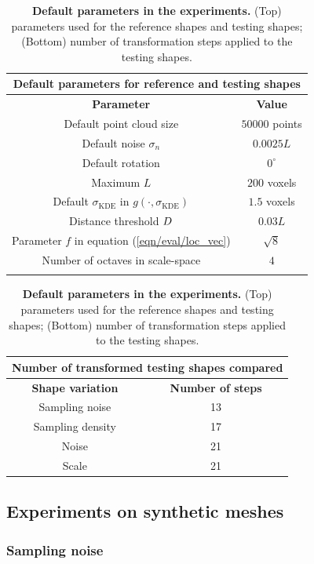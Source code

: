 \begin{table}[ht]
\centering
\begin{tabular}{|c|c|}
\hline
\multicolumn{2}{|c|}{ \textbf{Default parameters for reference and testing shapes }} \\ 
\hline
\textbf{Parameter} & \textbf{Value} \\
\hline
Default point cloud size & $50000$ points\\
Default noise $\sigma_{n}$ & $0.0025L$\\ 
Default rotation & $0^{\circ}$\\
Maximum $L$ & $200$ voxels\\
Default $\sigma_{\textrm{KDE}}$ in $g(\cdot,\sigma_{\textrm{KDE}})$ & $1.5$ voxels \\ 
Distance threshold $D$ & $0.03L$ \\
Parameter $f$ in equation (\ref{eqn/eval/loc_vec}) & $\sqrt{8}$ \\
Number of octaves in scale-space & $4$ \\
\hline
\multicolumn{2}{c}{}\\
\end{tabular}
\begin{tabular}{|c|c|}
\hline
\multicolumn{2}{|c|}{ \textbf{ Number of transformed testing shapes compared }} \\
\hline 
\textbf{Shape variation} & \textbf{Number of steps} \\
\hline
Sampling noise & 13 \\
Sampling density & 17 \\
Noise & 21 \\
Scale & 21 \\
\hline
\end{tabular}
\caption{\textbf{Default parameters in the experiments.} (Top) parameters used for the reference shapes and testing shapes; (Bottom) number of transformation steps applied to the testing shapes.}
\label{tab/eval/referenceparam}
\end{table}

\subsection{Experiments on synthetic meshes}

\subsubsection{Sampling noise}

